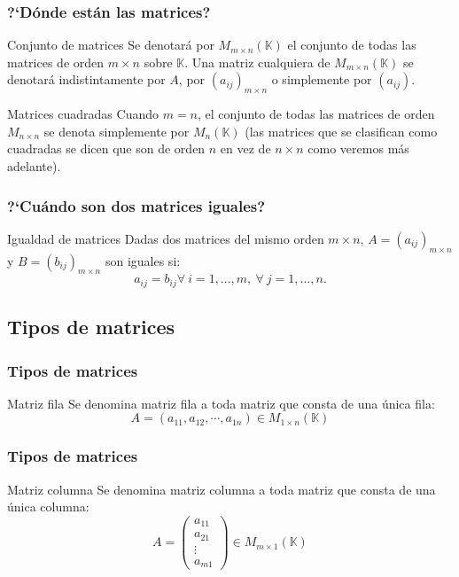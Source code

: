 \documentclass[aspectratio=169]{beamer}
\begin{document}
\begin{frame}
  \frametitle{?`D\'onde est\'an las matrices?}
  \begin{block}{Conjunto de matrices}
Se denotar\'a por $M_{m\times n}(\mathbb{K})$ el conjunto de todas las matrices de orden $m\times n$ sobre $\mathbb{K}$. Una matriz cualquiera de $M_{m\times n}(\mathbb{K})$ se denotar\'a indistintamente por $A$, por $(a_{ij})_{m\times n}$ o simplemente por $(a_{ij})$. 
  \end{block}

  \begin{block}{Matrices cuadradas}
 Cuando $m = n$, el conjunto de todas las matrices de orden $M_{n\times n}$ se denota simplemente por $M_{n}(\mathbb{K})$ (las matrices que se clasifican como cuadradas se dicen que son de orden $n$ en vez de $n \times n$ como veremos m\'as adelante).
  \end{block}
\end{frame}




\begin{frame}
  \frametitle{?`Cu\'ando son dos matrices iguales?}
  \begin{block}{Igualdad de matrices}
Dadas dos matrices del mismo orden $m \times n$, $A = (a_{ij} )_{m\times n}$ y $B = (b_{ij} )_{m\times n}$ son iguales si:
\[a_{ij} = b_{ij} \forall\  i = 1,...,m, \ \forall\ j = 1,...,n.\]
  \end{block}

 \end{frame}


\subsection{Tipos de matrices}

 \begin{frame}
  \frametitle{Tipos de matrices}
  \begin{block}{Matriz fila}
Se denomina matriz fila a toda matriz que consta de una \'unica fila:
\[ A = (a_{11}, a_{12}, \cdots, a_{1n})\in M_{1\times n} (\mathbb{K})\]
  \end{block}

 \end{frame}

\begin{frame}
  \frametitle{Tipos de matrices}
  \begin{block}{Matriz columna}
Se denomina matriz columna a toda matriz que consta de una \'unica columna:
\[ A = \left(\begin{matrix} %
      a_{11}  \\
      a_{21} \\
      \vdots \\
      a_{m1}
   \end{matrix}\right) \in M_{m\times 1} (\mathbb{K})\]
  \end{block}

 \end{frame}
\end{document}
